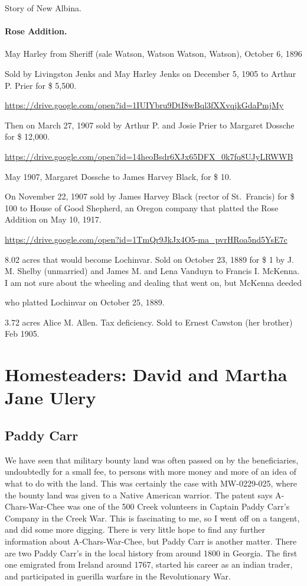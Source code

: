 \documentclass[
  12pt,
]{book}
\begin{document}
Story of New Albina.

\hypertarget{rose-addition.}{%
\paragraph{Rose Addition.}\label{rose-addition.}}

May Harley from Sheriff (sale Watson, Watson Watson, Watson), October 6, 1896

Sold by Livingston Jenks and May Harley Jenks on December 5, 1905 to Arthur P. Prier for \$ 5,500.

\url{https://drive.google.com/open?id=1IUIYbru9DtI8wBql3fXXvqjkGdaPmjMy}

Then on March 27, 1907 sold by Arthur P. and Josie Prier to Margaret Dossche for \$ 12,000.

\url{https://drive.google.com/open?id=14heoBsdr6XJx65DFX_0k7fq8UJyLRWWB}

May 1907, Margaret Dossche to James Harvey Black, for \$ 10.

On November 22, 1907 sold by James Harvey Black (rector of St.~Francis) for \$ 100 to House of Good Shepherd, an Oregon company that platted the Rose Addition on May 10, 1917.

\url{https://drive.google.com/open?id=1TmQr9JkJx4O5-ma_pvrHRoa5nd5YsE7c}

8.02 acres that would become Lochinvar. Sold on October 23, 1889 for \$ 1 by J. M. Shelby (unmarried) and James M. and Lena Vanduyn to Francis I. McKenna. I am not sure about the wheeling and dealing that went on, but McKenna deeded

who platted Lochinvar on October 25, 1889.

3.72 acres Alice M. Allen. Tax deficiency. Sold to Ernest Cawston (her brother) Feb 1905.

\hypertarget{homesteaders-david-and-martha-jane-ulery}{%
\section{Homesteaders: David and Martha Jane Ulery}\label{homesteaders-david-and-martha-jane-ulery}}

\hypertarget{paddy-carr}{%
\subsection{Paddy Carr}\label{paddy-carr}}

We have seen that military bounty land was often passed on by the beneficiaries, undoubtedly for a small fee, to persons with more money and more of an idea of what to do with the land. This was certainly the case with MW-0229-025, where the bounty land was given to a Native American warrior. The patent says A-Chars-War-Chee was one of the 500 Creek volunteers in Captain Paddy Carr's Company in the Creek War. This is fascinating to me, so I went off on a tangent, and did some more digging. There is very little hope to find any further information about A-Chars-War-Chee, but Paddy Carr is another matter. There are two Paddy Carr's in the local history from around 1800 in Georgia. The first one emigrated from Ireland around 1767, started his career as an indian trader, and participated in guerilla warfare in the Revolutionary War.
\end{document}
